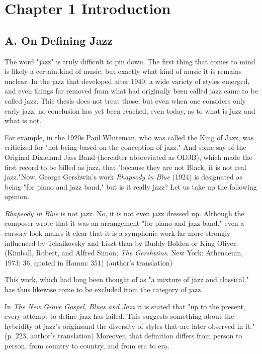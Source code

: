 \section{Chapter 1  Introduction}

\subsection{A. On Defining Jazz}

The word "jazz" is truly difficult to pin down. The first thing that comes to mind is likely a certain kind of music, but exactly what kind of music it is remains unclear. In the jazz that developed after 1940, a wide variety of styles emerged, and even things far removed from what had originally been called jazz came to be called jazz. This thesis does not treat those, but even when one considers only early jazz, no conclusion has yet been reached, even today, as to what is jazz and what is not.

For example, in the 1920s Paul Whiteman, who was called the King of Jazz, was criticized for "not being based on the conception of jazz." And some say of the Original Dixieland Jass Band (hereafter abbreviated as ODJB), which made the first record to be billed as jazz, that "because they are not Black, it is not real jazz."Now, George Gershwin's work \textit{Rhapsody in Blue} (1924) is designated as being "for piano and jazz band," but is it really jazz? Let us take up the following opinion.

\begin{gquote}
\textit{Rhapsody in Blue} is not jazz. No, it is not even jazz dressed up. Although the composer wrote that it was an arrangement "for piano and jazz band," even a cursory look makes it clear that it is a symphonic work far more strongly influenced by Tchaikovsky and Liszt than by Buddy Bolden or King Oliver. (Kimball, Robert, and Alfred Simon; \textit{The Gershwins}. New York: Athenaeum, 1973: 36, quoted in Hamm: 351) (author's translation)
\end{gquote}

This work, which had long been thought of as "a mixture of jazz and classical," has thus likewise come to be excluded from the category of jazz.

In \textit{The New Grove Gospel, Blues and Jazz} it is stated that "up to the present, every attempt to define jazz has failed. This suggests something about the hybridity at jazz's originsand the diversity of styles that are later observed in it." (p. 223, author's translation) Moreover, that definition differs from person to person, from country to country, and from era to era.

